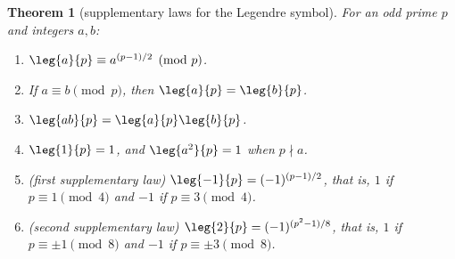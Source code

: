\documentclass[11pt]{article}
\theoremstyle{ntstyle}
\newtheorem{theorem}{Theorem}[subsection]
\begin{document}
\begin{theorem}[supplementary laws for the Legendre symbol]\label{thm:7.2.5} For an odd prime $p$
	and integers $a, b$:

	\begin{enumerate}[label={\alph*)}]
		\item $\leg{a}{p} \equiv a^{(p-1)/2} \pmod{p}$.

		\item If $a \equiv b \pmod{p}$, then $\leg{a}{p} =
			      \leg{b}{p}$.

		\item $\leg{ab}{p} =
			      \leg{a}{p}\leg{b}{p}$.

		\item $\leg{1}{p} = 1$, and $\leg{a^{2}}{p}
			      = 1$ when $p \nmid a$.

		\item (first supplementary law) $\leg{-1}{p} = (-1)^{(p-1)/2}$, that is,
		      $1$ if $p \equiv 1 \pmod{4}$ and $-1$ if $p \equiv 3 \pmod{4}$.

		\item (second supplementary law) $\leg{2}{p} = (-1)^{(p^{2}-1)/8}$, that
		      is, $1$ if $p \equiv \pm 1 \pmod{8}$ and $-1$ if $p \equiv \pm 3
			      \pmod{8}$.
	\end{enumerate}

\end{theorem}
\end{document}
